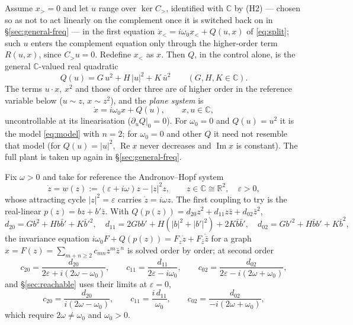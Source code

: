 \documentclass[11pt,reqno]{amsart}
\theoremstyle{plain}
\theoremstyle{definition}
\theoremstyle{remark}
\newcommand{\R}{\mathbb{R}}
\newcommand{\C}{\mathbb{C}}
\begin{document}
Assume $x_>=0$ and let $u$ range over $\ker C_>$, identified with $\C$ by (H2) --- chosen so as not to act linearly on the complement once it is switched back on in \S\ref{sec:general-freq} --- in the
first equation
$\dot x_<=i\omega_0 x_<+Q(u,x)$ of \eqref{eq:split}; such $u$ enters the complement equation only through the higher-order term $R(u,x)$, since $C_>u=0$. Redefine $x_<$ as $x$. Then
$Q$, in the control alone, is the general $\C$-valued real quadratic
\[
  Q(u)=G\,u^{2}+H\,|u|^{2}+K\,\bar u^{2}\qquad(G,H,K\in\C).
\]
The terms $u\cdot x$, $x^{2}$ and those of order three are of higher order in the reference
variable below ($u\sim z$, $x\sim z^{2}$), and the \emph{plane system} is
\begin{equation}\label{eq:model-w0}
  \dot x=i\omega_0 x+Q(u),\qquad x,u\in\C,
\end{equation}
uncontrollable at its linearisation ($\partial_uQ|_0=0$). For $\omega_0=0$ and $Q(u)=u^{2}$ it is
the model \eqref{eq:model} with $n=2$; for $\omega_0=0$ and other $Q$ it need not resemble that
model (for $Q(u)=|u|^{2}$, $\operatorname{Re}x$ never decreases and $\operatorname{Im}x$ is constant).
The full plant is taken up again in \S\ref{sec:general-freq}.

Fix $\omega>0$ and take for reference the Andronov--Hopf system
\begin{equation}\label{eq:hopf-ref}
  \dot z=w(z):=(\varepsilon+i\omega)z-|z|^{2}z,\qquad z\in\C\cong\R^{2},\quad\varepsilon>0,
\end{equation}
whose attracting cycle $|z|^{2}=\varepsilon$ carries $\dot z=i\omega z$. The first coupling to try is
the real-linear $p(z)=bz+b'\bar z$. With
$Q(p(z))=d_{20}z^{2}+d_{11}z\bar z+d_{02}\bar z^{2}$,
\begin{equation}\label{eq:drive}
  d_{20}=Gb^{2}+Hb\bar b'+K\bar b'^{2},\quad
  d_{11}=2Gbb'+H(|b|^{2}+|b'|^{2})+2K\bar b\bar b',\quad
  d_{02}=Gb'^{2}+H\bar bb'+K\bar b^{2},
\end{equation}
the invariance equation $i\omega_0F+Q(p(z))=F_z\dot z+F_{\bar z}\dot{\bar z}$ for a graph
$x=F(z)=\sum_{m+n\ge2}c_{mn}z^{m}\bar z^{\,n}$ is solved order by order; at second order
\begin{equation}\label{eq:c-eps}
  c_{20}=\frac{d_{20}}{2\varepsilon+i(2\omega-\omega_0)},\qquad
  c_{11}=\frac{d_{11}}{2\varepsilon-i\omega_0},\qquad
  c_{02}=\frac{d_{02}}{2\varepsilon-i(2\omega+\omega_0)},
\end{equation}
and \S\ref{sec:reachable} uses their limits at $\varepsilon=0$,
\begin{equation}\label{eq:c-zero}
  c_{20}=\frac{d_{20}}{i(2\omega-\omega_0)},\qquad
  c_{11}=\frac{i\,d_{11}}{\omega_0},\qquad
  c_{02}=\frac{d_{02}}{-i(2\omega+\omega_0)},
\end{equation}
which require $2\omega\neq\omega_0$ and $\omega_0>0$.
\end{document}

